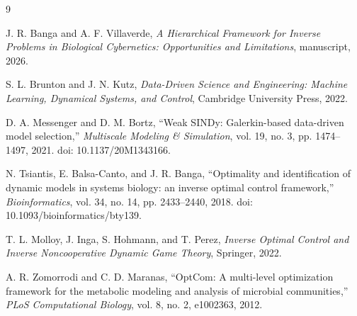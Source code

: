 \documentclass[11pt,a4paper]{article}
\begin{document}
\begin{thebibliography}{9}

J. R. Banga and A. F. Villaverde,
\emph{A Hierarchical Framework for Inverse Problems in Biological
Cybernetics: Opportunities and Limitations},
manuscript, 2026.

S. L. Brunton and J. N. Kutz,
\emph{Data-Driven Science and Engineering: Machine Learning, Dynamical
Systems, and Control},
Cambridge University Press, 2022.

D. A. Messenger and D. M. Bortz,
``Weak SINDy: Galerkin-based data-driven model selection,''
\emph{Multiscale Modeling \& Simulation}, vol. 19, no. 3,
pp. 1474--1497, 2021.
doi: 10.1137/20M1343166.

N. Tsiantis, E. Balsa-Canto, and J. R. Banga,
``Optimality and identification of dynamic models in systems biology:
an inverse optimal control framework,''
\emph{Bioinformatics}, vol. 34, no. 14, pp. 2433--2440, 2018.
doi: 10.1093/bioinformatics/bty139.

T. L. Molloy, J. Inga, S. Hohmann, and T. Perez,
\emph{Inverse Optimal Control and Inverse Noncooperative Dynamic Game Theory},
Springer, 2022.

A. R. Zomorrodi and C. D. Maranas,
``OptCom: A multi-level optimization framework for the metabolic modeling and
analysis of microbial communities,''
\emph{PLoS Computational Biology}, vol. 8, no. 2, e1002363, 2012.

\end{thebibliography}
\end{document}
